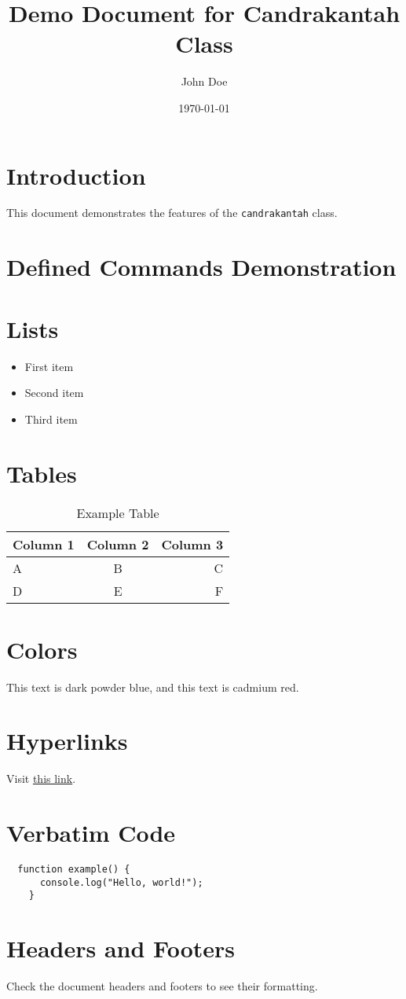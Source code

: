 \documentclass{candrakantah}
\title{Demo Document for Candrakantah Class}
\author{John Doe}
\date{\today}
\begin{document}
\maketitle

\section{Introduction}
This document demonstrates the features of the \texttt{candrakantah} class.

\section{Defined Commands Demonstration}

\section{Lists}
\begin{itemize}
  \item First item
  \item Second item
  \item Third item
\end{itemize}

\section{Tables}
\begin{table}[h]
  \centering
  \begin{tabular}{lcr}
    \toprule
    Column 1 & Column 2 & Column 3 \\
    \midrule
    A        & B        & C        \\
    D        & E        & F        \\
    \bottomrule
  \end{tabular}
  \caption{Example Table}
\end{table}

\section{Colors}
This text is \textcolor{darkpowderblue}{dark powder blue}, and this text is \textcolor{cadmiumred}{cadmium red}.

\section{Hyperlinks}
Visit \href{https://www.example.com}{this link}.

\section{Verbatim Code}
\begin{Verbatim}
  function example() {
      console.log("Hello, world!");
    }
\end{Verbatim}

\section{Headers and Footers}
Check the document headers and footers to see their formatting.
\end{document}
